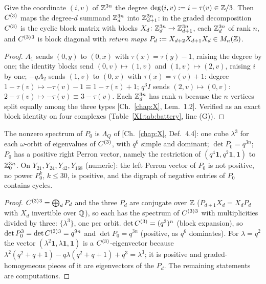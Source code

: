 \begin{lemma}[Grading]\label{XI:lem:grading}
Give the coordinate $(i,v)$ of $\mathbb{Z}^{3n}$ the degree $\deg(i,v):=i-\tau(v)\in\mathbb{Z}/3$. Then
$C^{(3)}$ maps the degree-$d$ summand $\mathbb{Z}^{3n}_d$ into $\mathbb{Z}^{3n}_{d+1}$: in the graded
decomposition $C^{(3)}$ is the cyclic block matrix with blocks $X_d\colon\mathbb{Z}^{3n}_d\to
\mathbb{Z}^{3n}_{d+1}$, each $\mathbb{Z}^{3n}_d$ of rank $n$, and $C^{(3)}{}^{3}$ is block diagonal with
\emph{return maps} $P_d:=X_{d+2}X_{d+1}X_d\in M_n(\mathbb{Z})$.
\end{lemma}

\begin{proof}
$A_1$ sends $(0,y)$ to $(0,x)$ with $\tau(x)=\tau(y)-1$, raising the degree by one; the
identity blocks send $(0,v)\mapsto(1,v)$ and $(1,v)\mapsto(2,v)$, raising $i$ by one;
$-qA_2$ sends $(1,v)$ to $(0,x)$ with $\tau(x)=\tau(v)+1$: degree $1-\tau(v)\mapsto
-\tau(v)-1\equiv1-\tau(v)+1$; $q^{3}I$ sends $(2,v)\mapsto(0,v)$: $2-\tau(v)\mapsto-\tau(v)
\equiv3-\tau(v)$. Each $\mathbb{Z}^{3n}_d$ has rank $n$ because the $n$ vertices split equally
among the three types [Ch.~\ref{chap:X}, Lem.~1.2]. Verified as an exact block identity on four complexes
(Table~\ref{XI:tab:battery}, line (G)).
\end{proof}

\begin{proposition}\label{XI:prop:P0}
The nonzero spectrum of $P_0$ is $\Lambda_Q$ of {\rm[Ch.~\ref{chap:X}, Def.~4.4]}: one cube $\lambda^{3}$
for each $\omega$-orbit of eigenvalues of $C^{(3)}$, with $q^{6}$ simple and dominant;
$\det P_0=q^{3n}$; $P_0$ has a positive right Perron vector, namely the restriction of
$(q^{4}\mathbf1,q^{2}\mathbf1,\mathbf1)$ to $\mathbb{Z}^{3n}_0$. On $Y_{21},Y_{24},Y_{42},Y_{168}$
(numeric): the left Perron vector of $P_0$ is not positive, no power $P_0^{k}$, $k\le30$, is
positive, and the digraph of negative entries of $P_0$ contains cycles.
\end{proposition}

\begin{proof}
$C^{(3)}{}^{3}=\bigoplus_dP_d$ and the three $P_d$ are conjugate over $\mathbb{Z}$ ($P_{d+1}X_d=X_dP_d$
with $X_d$ invertible over $\mathbb{Q}$), so each has the spectrum of $C^{(3)}{}^{3}$ with
multiplicities divided by three: $\{\lambda^{3}\}$, one per orbit. $\det C^{(3)}=(q^{3})^{n}$
(block expansion), so $\det P_0^{3}=\det C^{(3)}{}^{3}=q^{9n}$ and $\det P_0=q^{3n}$
(positive, as $q^{6}$ dominates). For $\lambda=q^{2}$ the vector $(\lambda^{2}\mathbf1,\lambda
\mathbf1,\mathbf1)$ is a $C^{(3)}$-eigenvector because $\lambda^{2}(q^{2}+q+1)-q\lambda(q^{2}
+q+1)+q^{3}=\lambda^{3}$; it is positive and graded-homogeneous pieces of it are
eigenvectors of the $P_d$. The remaining statements are computations.
\end{proof}

